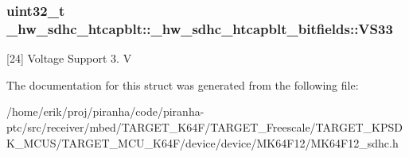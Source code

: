 \subsubsection[{\texorpdfstring{V\+S33}{VS33}}]{\setlength{\rightskip}{0pt plus 5cm}uint32\+\_\+t \+\_\+hw\+\_\+sdhc\+\_\+htcapblt\+::\+\_\+hw\+\_\+sdhc\+\_\+htcapblt\+\_\+bitfields\+::\+V\+S33}\hypertarget{struct__hw__sdhc__htcapblt_1_1__hw__sdhc__htcapblt__bitfields_adce28b1e57addab9a3c9419c7eb43edb}{}\label{struct__hw__sdhc__htcapblt_1_1__hw__sdhc__htcapblt__bitfields_adce28b1e57addab9a3c9419c7eb43edb}
\mbox{[}24\mbox{]} Voltage Support 3. V 

The documentation for this struct was generated from the following file\+:\begin{DoxyCompactItemize}
\item 
/home/erik/proj/piranha/code/piranha-\/ptc/src/receiver/mbed/\+T\+A\+R\+G\+E\+T\+\_\+\+K64\+F/\+T\+A\+R\+G\+E\+T\+\_\+\+Freescale/\+T\+A\+R\+G\+E\+T\+\_\+\+K\+P\+S\+D\+K\+\_\+\+M\+C\+U\+S/\+T\+A\+R\+G\+E\+T\+\_\+\+M\+C\+U\+\_\+\+K64\+F/device/device/\+M\+K64\+F12/M\+K64\+F12\+\_\+sdhc.\+h\end{DoxyCompactItemize}
